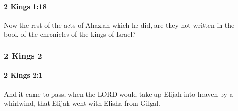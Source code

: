 		\paragraph{2 Kings 1:18} %
			\label{2KINGS-1-18}

			Now the rest of the acts of Ahaziah which he did, are they not written in the book of the chronicles of the kings of Israel?

	\subsubsection{2 Kings 2} %
		\label{2KINGS-2}

		\paragraph{2 Kings 2:1} %
			\label{2KINGS-2-1}

			And it came to pass, when the LORD would take up Elijah into heaven by a whirlwind, that Elijah went with Elisha from Gilgal.

